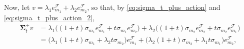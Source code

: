\documentclass[twoside,11pt]{book}
\numberwithin{theorem}{chapter}
\numberwithin{definition}{chapter}
\numberwithin{proposition}{chapter}
\numberwithin{corollary}{chapter}
\numberwithin{example}{chapter}
\numberwithin{lemma}{chapter}
\begin{document}
Now, let $v = \lambda_{1} e_{m_{1}}^{\mathcal{F}} + \lambda_{2} e_{m_{2}}^{\mathcal{F}}$, so that, by \eqref{eq:sigma_t_plus_action} and \eqref{eq:sigma_t_plus_action_2},
\begin{align}
\bm{\Sigma}_{t}^{+} v & = \lambda_{1} \bigg((1+t) \sigma_{m_{1}} e_{m_{1}}^{\mathcal{F}} + t \sigma_{m_{1}}  e_{m_{2}}^{\mathcal{F}} \bigg) + \lambda_{2} \bigg((1+t) \sigma_{m_{2}} e_{m_{2}}^{\mathcal{F}}  + t \sigma_{m_{2}}  e_{m_{1}}^{\mathcal{F}} \bigg) \nonumber \\
\label{eq:sigma_t_plus_action_v}
& = \bigg( \lambda_{1} (1+t) \sigma_{m_{1}} + \lambda_{2} t \sigma_{m_{2}} \bigg) e_{m_{1}}^{\mathcal{F}} + \bigg( \lambda_{2} (1+t) \sigma_{m_{2}} + \lambda_{1}t\sigma_{m_{1}} \bigg) e_{m_{2}} ^{\mathcal{F}},
\end{align}
\end{document}
